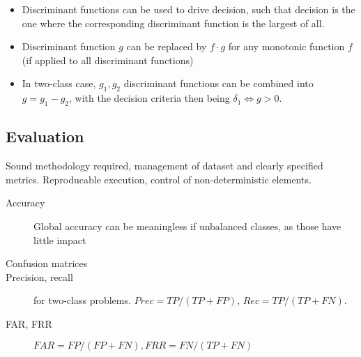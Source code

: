 \begin{itemize}
		\item Discriminant functions can be used to drive decision, such that
				decision is the one where the corresponding discriminant
				function is the largest of all.
		\item Discriminant function $g$ can be replaced by $f \cdot g$ for any
				monotonic function $f$ (if applied to all discriminant
				functions)
		\item In two-class case, $g_1, g_2$ discriminant functions can be
				combined into $g = g_1 - g_2$, with the decision criteria then
				being $\delta_1 \Leftrightarrow g > 0$.
\end{itemize}

\subsection{Evaluation}

Sound methodology required, management of dataset and clearly specified
metrics. Reproducable execution, control of non-deterministic elements.

\begin{description}
		\item[Accuracy] Global accuracy can be meaningless if unbalanced
				classes, as those have little impact
		\item[Confusion matrices]
		\item[Precision, recall] for two-class problems. $Prec = TP / (TP +
				FP)$, $Rec = TP / (TP + FN)$.
		\item[FAR, FRR] $FAR = FP / (FP + FN), FRR = FN / (TP + FN)$
\end{description}
